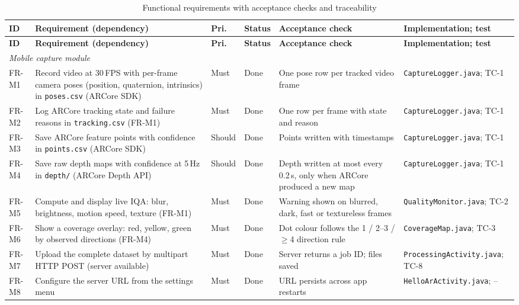 {\footnotesize\setlength{\tabcolsep}{3pt}
\begin{longtable}{p{}p{}p{}p{}p{}p{}}
\caption{Functional requirements with acceptance checks and traceability}\label{tab:fr}\\
\toprule
\textbf{ID} & \textbf{Requirement (dependency)} & \textbf{Pri.} & \textbf{Status} & \textbf{Acceptance check} & \textbf{Implementation; test} \\
\midrule
\endfirsthead
\toprule
\textbf{ID} & \textbf{Requirement (dependency)} & \textbf{Pri.} & \textbf{Status} & \textbf{Acceptance check} & \textbf{Implementation; test} \\
\midrule
\endhead
\multicolumn{6}{l}{\textit{Mobile capture module}} \\
FR-M1 & Record video at 30\,FPS with per-frame camera poses (position, quaternion, intrinsics) in \texttt{poses.csv} (ARCore SDK) & Must & Done & One pose row per tracked video frame & \texttt{CaptureLogger.java}; TC-1 \\
FR-M2 & Log ARCore tracking state and failure reasons in \texttt{tracking.csv} (FR-M1) & Must & Done & One row per frame with state and reason & \texttt{CaptureLogger.java}; TC-1 \\
FR-M3 & Save ARCore feature points with confidence in \texttt{points.csv} (ARCore SDK) & Should & Done & Points written with timestamps & \texttt{CaptureLogger.java}; TC-1 \\
FR-M4 & Save raw depth maps with confidence at 5\,Hz in \texttt{depth/} (ARCore Depth API) & Should & Done & Depth written at most every 0.2\,s, only when ARCore produced a new map & \texttt{CaptureLogger.java}; TC-1 \\
FR-M5 & Compute and display live IQA: blur, brightness, motion speed, texture (FR-M1) & Must & Done & Warning shown on blurred, dark, fast or textureless frames & \texttt{QualityMonitor.java}; TC-2 \\
FR-M6 & Show a coverage overlay: red, yellow, green by observed directions (FR-M4) & Must & Done & Dot colour follows the 1 / 2--3 / $\geq$4 direction rule & \texttt{CoverageMap.java}; TC-3 \\
FR-M7 & Upload the complete dataset by multipart HTTP POST (server available) & Must & Done & Server returns a job ID; files saved & \texttt{ProcessingActivity.java}; TC-8 \\
FR-M8 & Configure the server URL from the settings menu & Must & Done & URL persists across app restarts & \texttt{HelloArActivity.java}; -- \\

\end{longtable}}
